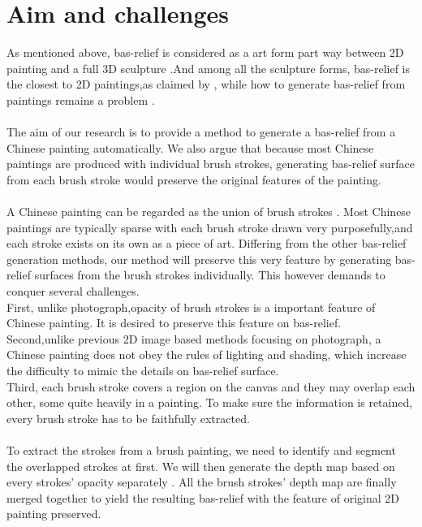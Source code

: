 \section{Aim and challenges}
As mentioned above, bas-relief is considered as a art form part way between 2D painting and a full 3D sculpture\cite{benzaid2017analysis}\cite{weyrich2007digital}\cite{kerber2009feature}\cite{kerber2012computer}\cite{zeng2014region} .And among all the sculpture forms, bas-relief is the closest to 2D paintings,as claimed by \cite{kerber2009feature} \cite{barron2012color}, while how to generate bas-relief from  paintings remains a problem .\\ \\
The aim of our research is to provide a method to generate a bas-relief from a Chinese painting automatically. We also argue that because most Chinese paintings are produced with individual brush strokes, generating bas-relief surface from each brush stroke would preserve the original features of the painting.\\ \\
A Chinese painting can be regarded as the union of brush strokes \cite{xu2006animating}. Most Chinese paintings are typically sparse with each brush stroke drawn very purposefully\cite{smith1997art},and each stroke exists on its own as a piece of art\cite{girshick2004simulating}.
Differing from the other bas-relief generation methods, our method will preserve this very feature by generating bas-relief surfaces from the brush strokes individually. 
This however demands to conquer several challenges.\\ 
First, unlike photograph,opacity of brush strokes is a important feature of Chinese painting. It is desired to preserve this feature on bas-relief.\\ Second,unlike previous 2D image based methods focusing on photograph, a Chinese painting does not obey the rules of lighting and shading, which increase the difficulty to mimic the details on bas-relief surface. \\Third, each brush stroke covers a region on the canvas and they may overlap each other, some quite heavily in a painting. To make sure the information is retained, every brush stroke has to be faithfully extracted. \\  \\
To extract the strokes from a brush painting, we need to identify and segment the overlapped strokes at first. We will then generate the depth map based on every strokes' opacity separately . All the brush strokes' depth map are finally merged together to yield the resulting bas-relief with the feature of original 2D painting preserved.

